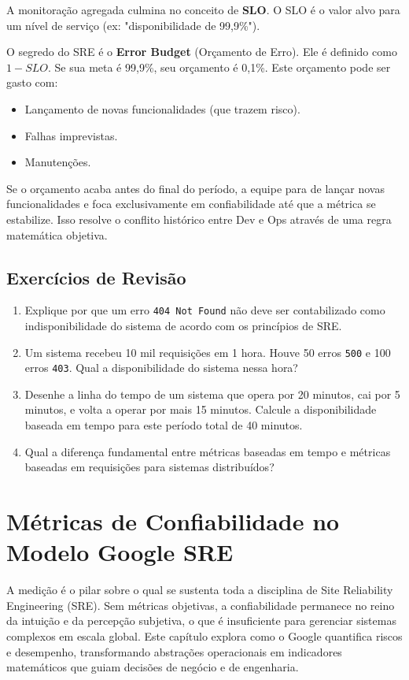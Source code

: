 \documentclass[12pt,a4paper,twoside]{report}
\begin{document}
A monitoração agregada culmina no conceito de \textbf{SLO}. O SLO é o valor alvo para um nível de serviço (ex: "disponibilidade de 99,9\%"). 

O segredo do SRE é o \textbf{Error Budget} (Orçamento de Erro). Ele é definido como $1 - SLO$. Se sua meta é 99,9\%, seu orçamento é 0,1\%.
Este orçamento pode ser gasto com:
\begin{itemize}
    \item Lançamento de novas funcionalidades (que trazem risco).
    \item Falhas imprevistas.
    \item Manutenções.
\end{itemize}

Se o orçamento acaba antes do final do período, a equipe para de lançar novas funcionalidades e foca exclusivamente em confiabilidade até que a métrica se estabilize. Isso resolve o conflito histórico entre Dev e Ops através de uma regra matemática objetiva.

\section{Exercícios de Revisão}

\begin{enumerate}
    \item Explique por que um erro \texttt{404 Not Found} não deve ser contabilizado como indisponibilidade do sistema de acordo com os princípios de SRE.
    \item Um sistema recebeu 10 mil requisições em 1 hora. Houve 50 erros \texttt{500} e 100 erros \texttt{403}. Qual a disponibilidade do sistema nessa hora?
    \item Desenhe a linha do tempo de um sistema que opera por 20 minutos, cai por 5 minutos, e volta a operar por mais 15 minutos. Calcule a disponibilidade baseada em tempo para este período total de 40 minutos.
    \item Qual a diferença fundamental entre métricas baseadas em tempo e métricas baseadas em requisições para sistemas distribuídos?
\end{enumerate}

\chapter{Métricas de Confiabilidade no Modelo Google SRE}

A medição é o pilar sobre o qual se sustenta toda a disciplina de Site Reliability Engineering (SRE). Sem métricas objetivas, a confiabilidade permanece no reino da intuição e da percepção subjetiva, o que é insuficiente para gerenciar sistemas complexos em escala global. Este capítulo explora como o Google quantifica riscos e desempenho, transformando abstrações operacionais em indicadores matemáticos que guiam decisões de negócio e de engenharia.
\end{document}
